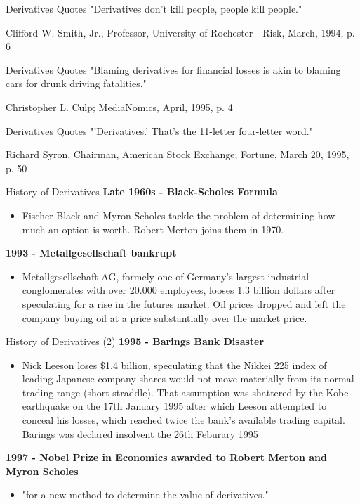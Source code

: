 {Derivatives Quotes}
"Derivatives don't kill people, people kill people."
\begin{flushright}
  \begin{footnotesize}
 Clifford W. Smith, Jr., Professor, University of Rochester - Risk, March, 1994, p. 6
 \end{footnotesize}
\end{flushright}

{Derivatives Quotes}
"Blaming derivatives for financial losses is akin to blaming cars for drunk driving fatalities."
\begin{flushright}
  \begin{footnotesize}
 Christopher L. Culp; MediaNomics, April, 1995, p. 4
 \end{footnotesize}
\end{flushright}

{Derivatives Quotes}
"'Derivatives.' That's the 11-letter four-letter word."
\begin{flushright}
  \begin{footnotesize}
  Richard Syron, Chairman, American Stock Exchange; Fortune, March 20, 1995, p. 50
 \end{footnotesize}
\end{flushright}

{History of Derivatives}
\textbf{Late 1960s - Black-Scholes Formula}\\
\begin{itemize}
  \item Fischer Black and Myron Scholes tackle the problem of determining how much an option is worth. Robert Merton joins them in 1970.
\end{itemize}

\textbf{1993 - Metallgesellschaft bankrupt}
\begin{itemize}
  \item Metallgesellschaft AG, formely one of Germany's largest industrial conglomerates with over 20.000 employees, looses 1.3 billion dollars after speculating for a rise in the futures market. Oil prices dropped and left the company buying oil at a price substantially over the market price.
\end{itemize}

{History of Derivatives (2)}
\textbf{1995 - Barings Bank Disaster }
\begin{itemize}
  \item Nick Leeson loses $\$$1.4 billion, speculating that the Nikkei 225 index of leading Japanese company shares would not move materially from its normal trading range (short straddle). That assumption was shattered by the Kobe earthquake on the 17th January 1995 after which Leeson attempted to conceal his losses, which reached twice the bank's available trading capital. Barings was declared insolvent the 26th Feburary 1995
\end{itemize}
\textbf{1997 - Nobel Prize in Economics awarded to Robert Merton and Myron Scholes}
\begin{itemize}
  \item "for a new method to determine the value of derivatives."
\end{itemize}

